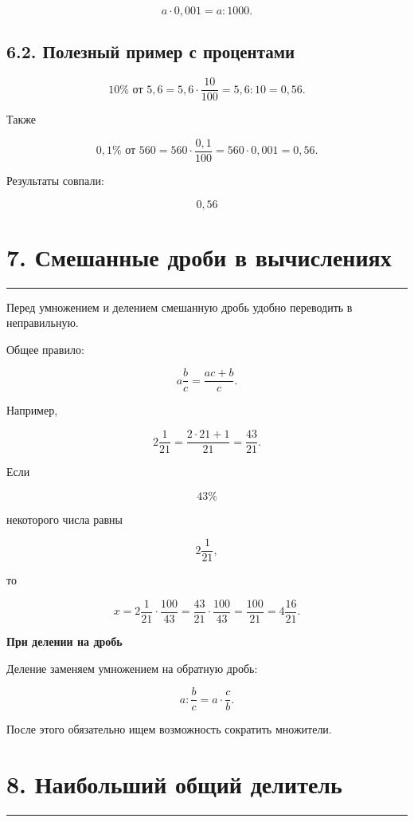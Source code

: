 \documentclass[a4paper,12pt]{article}
\newcommand{\sectionline}{%
    \vspace{0.2em}
    {\color{accent}\rule{\linewidth}{0.6pt}}
    \vspace{0.5em}
}
\newcommand{\important}[1]{%
    \par\medskip
    {\color{darkaccent}\textbf{#1}}
    \par\smallskip
}
\begin{document}
\[
a\cdot0{,}001=a:1000.
\]

\subsection*{\color{accent}6.2. Полезный пример с процентами}

\[
10\%\text{ от }5{,}6
=
5{,}6\cdot\frac{10}{100}
=
5{,}6:10
=
0{,}56.
\]

Также

\[
0{,}1\%\text{ от }560
=
560\cdot\frac{0{,}1}{100}
=
560\cdot0{,}001
=
0{,}56.
\]

Результаты совпали:

\[
\boxed{0{,}56}
\]

\section*{\color{darkaccent}7. Смешанные дроби в вычислениях}
\sectionline

Перед умножением и делением смешанную дробь удобно переводить в неправильную.

Общее правило:

\[
a\frac{b}{c}
=
\frac{ac+b}{c}.
\]

Например,

\[
2\frac{1}{21}
=
\frac{2\cdot21+1}{21}
=
\frac{43}{21}.
\]

Если

\[
43\%
\]

некоторого числа равны

\[
2\frac{1}{21},
\]

то

\[
x
=
2\frac{1}{21}\cdot\frac{100}{43}
=
\frac{43}{21}\cdot\frac{100}{43}
=
\frac{100}{21}
=
4\frac{16}{21}.
\]

\important{При делении на дробь}

Деление заменяем умножением на обратную дробь:

\[
a:\frac{b}{c}
=
a\cdot\frac{c}{b}.
\]

После этого обязательно ищем возможность сократить множители.

\newpage

\section*{\color{darkaccent}8. Наибольший общий делитель}
\sectionline
\end{document}
